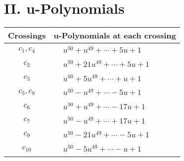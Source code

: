 \documentclass[1p]{elsarticle_modified}
\theoremstyle{definition}
\begin{document}
\newpage\renewcommand{\arraystretch}{1}
\centering \section*{ II. u-Polynomials}
\begin{tabular}{m{50pt}|m{274pt}}
Crossings & \hspace{64pt}u-Polynomials at each crossing \\
\hline $$\begin{aligned}c_{1},c_{4}\end{aligned}$$&$\begin{aligned}
&u^{50}+u^{49}+\cdots+5 u+1
\end{aligned}$\\
\hline $$\begin{aligned}c_{2}\end{aligned}$$&$\begin{aligned}
&u^{50}+21 u^{49}+\cdots+5 u+1
\end{aligned}$\\
\hline $$\begin{aligned}c_{3}\end{aligned}$$&$\begin{aligned}
&u^{50}+5 u^{49}+\cdots+u+1
\end{aligned}$\\
\hline $$\begin{aligned}c_{5},c_{8}\end{aligned}$$&$\begin{aligned}
&u^{50}- u^{49}+\cdots-5 u+1
\end{aligned}$\\
\hline $$\begin{aligned}c_{6}\end{aligned}$$&$\begin{aligned}
&u^{50}+u^{49}+\cdots-17 u+1
\end{aligned}$\\
\hline $$\begin{aligned}c_{7}\end{aligned}$$&$\begin{aligned}
&u^{50}- u^{49}+\cdots+17 u+1
\end{aligned}$\\
\hline $$\begin{aligned}c_{9}\end{aligned}$$&$\begin{aligned}
&u^{50}-21 u^{49}+\cdots-5 u+1
\end{aligned}$\\
\hline $$\begin{aligned}c_{10}\end{aligned}$$&$\begin{aligned}
&u^{50}-5 u^{49}+\cdots- u+1
\end{aligned}$\\
\hline
\end{tabular}\newpage\renewcommand{\arraystretch}{1}
\end{document}
